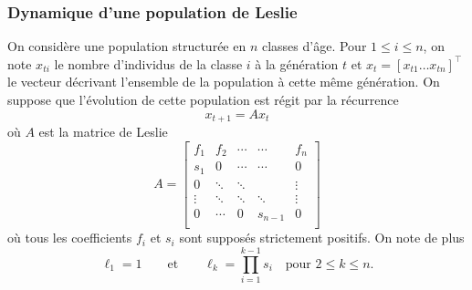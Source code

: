 \subsubsection{Dynamique d'une population de Leslie}

On considère une population structurée en $n$ classes d'âge. Pour $1 \leq i \leq n$, on note $x_{ti}$ le nombre d'individus de la classe $i$ à la génération $t$ et $x_t = [x_{t1} \dots x_{tn}]^\top$ le vecteur décrivant l'ensemble de la population à cette même génération. On suppose que l'évolution de cette population est régit par la récurrence
$$
x_{t+1} = A x_t
$$
où $A$ est la matrice de Leslie
$$
A = \left[\begin{array}{cccccc}
            f_1 & f_2 & \cdots  & \cdots & f_n \\
            s_1 & 0 & \cdots  & \cdots & 0 \\
            0 & \ddots  & \ddots & & \vdots \\
            \vdots & \ddots & \ddots & \ddots & \vdots \\
            0 & \cdots & 0 & s_{n-1} & 0 \\
          \end{array}\right]
$$
où tous les coefficients $f_i$ et $s_i$ sont supposés strictement positifs. On note de plus
$$
\ell_1 = 1 \qquad \text{et} \qquad 
\ell_k = \prod_{i=1}^{k-1} s_i \quad \text{pour $2 \leq k \leq n$}.
$$

